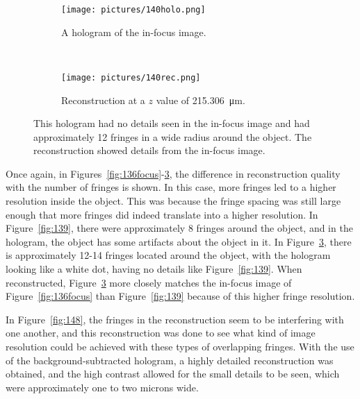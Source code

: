 \begin{figure}[ht!]
    \begin{center}

        \begin{subfigure}[t]{0.4\textwidth}
            \label{fig:140holo}
            \texttt{[image: pictures/140holo.png]}
            \caption{A hologram of the in-focus image.}
        \end{subfigure}
        \\
        \begin{subfigure}[t]{\textwidth}
            \label{fig:140rec}
            \texttt{[image: pictures/140rec.png]}
            \caption{Reconstruction at a $z$ value of
                \SI{215.306}{\micro\meter}.}
        \end{subfigure}


    \end{center}
    \caption{%
        This hologram had no details seen in the in-focus image and had
        approximately 12 fringes in a wide radius around the object. The
        reconstruction showed details from the in-focus image.
    }%
    \label{fig:140}
\end{figure}

Once again, in Figures~\ref{fig:136focus}-\ref{fig:140}, the difference in
reconstruction quality with the number of fringes is shown. In this case, 
more fringes led to a higher
resolution inside the object. This was because the fringe spacing was still
large enough that more fringes did indeed translate into a higher resolution.
In Figure~\ref{fig:139}, there were approximately
8 fringes around the object, and in the hologram, the object has some
artifacts about the object in it. In Figure~\ref{fig:140}, there is approximately
12-14 fringes located around the object, with the hologram looking like a white
dot, having no details like Figure~\ref{fig:139}. When reconstructed,
Figure~\ref{fig:140} more closely matches the in-focus image of
Figure~\ref{fig:136focus} than Figure~\ref{fig:139} because of this higher
fringe resolution.

In Figure~\ref{fig:148}, the fringes in the reconstruction seem to be
interfering with one another, and this reconstruction was done to see what kind
of image resolution could be achieved with these types of overlapping fringes.
With the use of the background-subtracted hologram, a highly detailed
reconstruction was obtained, and the high contrast allowed for the small
details to be seen, which were
approximately one to two microns wide.

